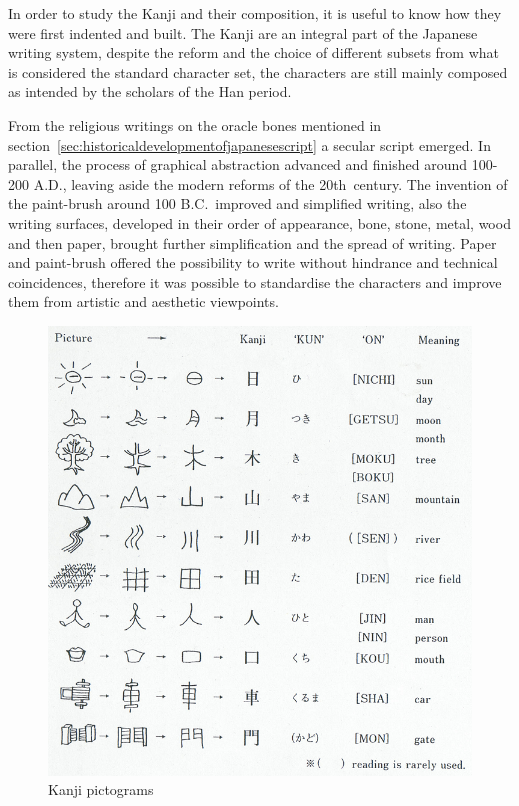 In order to study the Kanji and their composition, it is useful to know how they
were first indented and built. The Kanji are an integral part of the Japanese
writing system, despite the reform and the choice of different subsets from what 
is considered the standard character set, the characters are still mainly 
composed as intended by the scholars of the Han period.

From the religious writings on the oracle bones mentioned in 
section~\ref{sec:historicaldevelopmentofjapanesescript} a secular script 
emerged. In parallel, the process of graphical abstraction advanced and
finished around 100-200 A.D., leaving aside the modern reforms of the 
20th~century. The invention of the paint-brush around 100 B.C.\ improved and 
simplified writing, also the writing surfaces, developed in their order of 
appearance, bone, stone, metal, wood and then paper, brought further 
simplification and the spread of writing. Paper and paint-brush offered the 
possibility to write without hindrance and technical coincidences, 
therefore it was possible to standardise the characters and improve them from 
artistic and aesthetic viewpoints.

\begin{figure}[htbp]
\begin{center}
\includegraphics[scale=0.4]{images/Kanjipictograms.png}
\caption{Kanji pictograms}
\label{fig:Kanjipictograms}
\end{center}
\end{figure}

